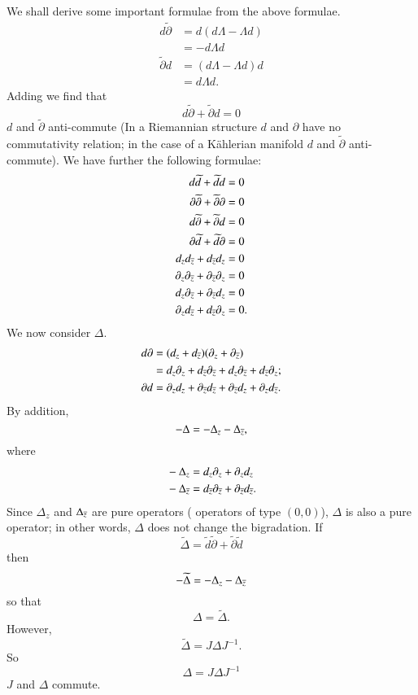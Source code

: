 We shall derive some important formulae from the above formulae.
\begin{align*}
d\widetilde{\partial} &= d(d\Lambda-\Lambda d)\\
&= -d\Lambda d\\
\widetilde{\partial} d &= (d\Lambda-\Lambda d)d\\
&= d\Lambda d.
\end{align*}
Adding we find that
$$
d\widetilde{\partial}+\widetilde{\partial}d=0
$$
\iec $d$ and $\widetilde{\partial}$ anti-commute (In a Riemannian
structure $d$ and $\partial$ have no commutativity relation; in the
case of a K\"ahlerian manifold $d$ and $\widetilde{\partial}$
anti-commute). We have further the following formulae:
\begin{align*}
d\widetilde{d}+\widetilde{d}d &= 0\\
\partial \widetilde{\partial}+\widetilde{\partial}\partial &=0\\
d\widetilde{\partial} +\widetilde{\partial}d &=0\\
\partial \widetilde{d}+\widetilde{d}\partial &=0\\
d_{z}d_{\overline{z}}+d_{\overline{z}}d_{z} &=0\\
\partial_{z}\partial_{\overline{z}}+\partial_{\overline{z}}\partial_{z} &=0\\
d_{z}\partial_{\overline{z}}+\partial_{\overline{z}}d_{z} &=0\\
\partial_{z}d_{\overline{z}}+d_{\overline{z}}\partial_{z} &=0.
\end{align*}\pageoriginale
We now consider $\Delta$.
\begin{align*}
d\partial &= (d_{z}+d_{\overline{z}})(\partial_{z}+\partial_{\overline{z}})\\
&=
d_{z}\partial_{z}+d_{\overline{z}}\partial_{\overline{z}}+d_{z}\partial_{\overline{z}}+d_{\overline{z}}\partial_{z};\\
\partial d & = \partial_{z}d_{z}+\partial_{\overline{z}}d_{\overline{z}} +
\partial_{\overline{z}}d_{z}+\partial_{z}d_{\overline{z}}.  
\end{align*}
By addition,
$$
-\Delta=-\Delta_{z}-\Delta_{\overline{z}},
$$
where
\begin{align*}
& -\Delta_{z}=d_{z}\partial_{z}+\partial_{z}d_{z}\\
& -\Delta_{\overline{z}}=d_{\overline{z}}\partial_{\overline{z}}+\partial_{\overline{z}}d_{\overline{z}}.
\end{align*}
Since $\Delta_{z}$ and $\Delta_{\overline{z}}$ are pure operators (\iec
operators of type $(0,0)$), $\Delta$ is also a pure operator; in other
words, $\Delta$ does not change the bigradation. If 
$$
\widetilde{\Delta}=\widetilde{d}\widetilde{\partial}+\widetilde{\partial}\widetilde{d} 
$$
then
$$
-\widetilde{\Delta}=-\Delta_{z}-\Delta_{\overline{z}}
$$
so that
$$
\Delta=\widetilde{\Delta}.
$$
However,\pageoriginale
$$
\widetilde{\Delta}=J\Delta J^{-1}.
$$
So
$$
\Delta=J\Delta J^{-1}
$$
\iec $J$ and $\Delta$ commute.


